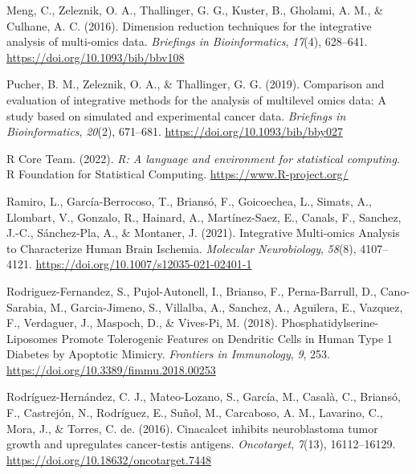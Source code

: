 \documentclass[a4paper, nobind]{templates/ociamthesis}
\newlength{\cslhangindent}
\newenvironment{CSLReferences}[2] %
 {%
  \setlength{\parindent}{0pt}
  \ifodd #1
  \let\oldpar\par
  \def\par{\hangindent=\cslhangindent\oldpar}
  \fi
  \setlength{\parskip}{1mm}
  \setlength{\baselineskip}{6mm}
 }%
 {}
\begin{document}
\begin{CSLReferences}{1}{0}
\leavevmode{}%
Meng, C., Zeleznik, O. A., Thallinger, G. G., Kuster, B., Gholami, A. M., \& Culhane, A. C. (2016). Dimension reduction techniques for the integrative analysis of multi-omics data. \emph{Briefings in Bioinformatics}, \emph{17}(4), 628--641. \url{https://doi.org/10.1093/bib/bbv108}

\leavevmode{}%
Pucher, B. M., Zeleznik, O. A., \& Thallinger, G. G. (2019). Comparison and evaluation of integrative methods for the analysis of multilevel omics data: A study based on simulated and experimental cancer data. \emph{Briefings in Bioinformatics}, \emph{20}(2), 671--681. \url{https://doi.org/10.1093/bib/bby027}

\leavevmode{}%
R Core Team. (2022). \emph{R: A language and environment for statistical computing}. R Foundation for Statistical Computing. \url{https://www.R-project.org/}

\leavevmode{}%
Ramiro, L., García-Berrocoso, T., Briansó, F., Goicoechea, L., Simats, A., Llombart, V., Gonzalo, R., Hainard, A., Martínez-Saez, E., Canals, F., Sanchez, J.-C., Sánchez-Pla, A., \& Montaner, J. (2021). Integrative {Multi}-omics {Analysis} to {Characterize} {Human} {Brain} {Ischemia}. \emph{Molecular Neurobiology}, \emph{58}(8), 4107--4121. \url{https://doi.org/10.1007/s12035-021-02401-1}

\leavevmode{}%
Rodriguez-Fernandez, S., Pujol-Autonell, I., Brianso, F., Perna-Barrull, D., Cano-Sarabia, M., Garcia-Jimeno, S., Villalba, A., Sanchez, A., Aguilera, E., Vazquez, F., Verdaguer, J., Maspoch, D., \& Vives-Pi, M. (2018). Phosphatidylserine-{Liposomes} {Promote} {Tolerogenic} {Features} on {Dendritic} {Cells} in {Human} {Type} 1 {Diabetes} by {Apoptotic} {Mimicry}. \emph{Frontiers in Immunology}, \emph{9}, 253. \url{https://doi.org/10.3389/fimmu.2018.00253}

\leavevmode{}%
Rodríguez-Hernández, C. J., Mateo-Lozano, S., García, M., Casalà, C., Briansó, F., Castrejón, N., Rodríguez, E., Suñol, M., Carcaboso, A. M., Lavarino, C., Mora, J., \& Torres, C. de. (2016). Cinacalcet inhibits neuroblastoma tumor growth and upregulates cancer-testis antigens. \emph{Oncotarget}, \emph{7}(13), 16112--16129. \url{https://doi.org/10.18632/oncotarget.7448}


\end{CSLReferences}
\end{document}
